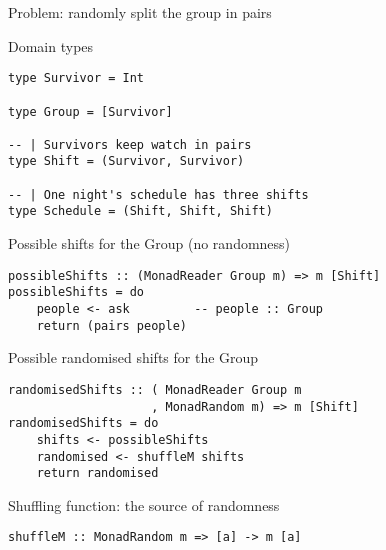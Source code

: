 \begin{frame}[fragile]{Problem: randomly split the group in pairs}
  \begin{figure}
    \centering
    \def\svgwidth{\columnwidth}
    
\end{figure}
\end{frame}

\begin{frame}[fragile]{Domain types}
  \begin{block}{}
  \begin{verbatim}
type Survivor = Int

type Group = [Survivor]

-- | Survivors keep watch in pairs
type Shift = (Survivor, Survivor)

-- | One night's schedule has three shifts
type Schedule = (Shift, Shift, Shift)
  \end{verbatim}
  \end{block}
\end{frame}

\begin{frame}[fragile]{Possible shifts for the Group (no randomness)}
  \begin{block}{}
  \begin{verbatim}
possibleShifts :: (MonadReader Group m) => m [Shift]
possibleShifts = do
    people <- ask         -- people :: Group
    return (pairs people)
  \end{verbatim}
  \end{block}
\end{frame}

\begin{frame}[fragile]{Possible randomised shifts for the Group}
  \begin{block}{}
  \begin{verbatim}
randomisedShifts :: ( MonadReader Group m
                    , MonadRandom m) => m [Shift]
randomisedShifts = do
    shifts <- possibleShifts
    randomised <- shuffleM shifts
    return randomised
  \end{verbatim}
  \end{block}
  \pause
  \begin{block}{Shuffling function: the source of randomness}
  \begin{verbatim}
shuffleM :: MonadRandom m => [a] -> m [a]
  \end{verbatim}
  \end{block}
\end{frame}

